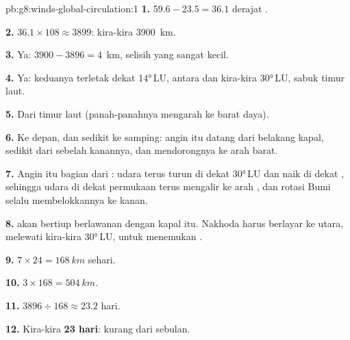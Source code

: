 \begin{solution}{pb:g8:winds-global-circulation:1}
\textbf{1.} $59.6 - 23.5 = 36.1$ derajat .

\textbf{2.} $36.1 \times 108 \approx 3899$: kira-kira \qty{3900}{km}.

\textbf{3.} Ya: $3900 - 3896 = 4$~km, selisih yang sangat kecil.

\textbf{4.} Ya: keduanya terletak dekat \ang{14}\,LU, antara 
dan kira-kira \ang{30}\,LU, sabuk  timur laut.

\textbf{5.} Dari timur laut (panah-panahnya mengarah ke barat daya).

\textbf{6.} Ke depan, dan sedikit ke samping: angin itu datang dari
belakang kapal, sedikit dari sebelah kanannya, dan mendorongnya ke arah
barat.

\textbf{7.} Angin itu bagian dari : udara terus turun di
dekat \ang{30}\,LU dan naik di dekat , sehingga udara di dekat
permukaan terus mengalir ke arah , dan rotasi Bumi selalu
membelokkannya ke kanan.

\textbf{8.}  akan bertiup berlawanan dengan kapal itu. Nakhoda
harus berlayar ke utara, melewati kira-kira \ang{30}\,LU, untuk menemukan
.

\textbf{9.} $7 \times 24 = \qty{168}{km}$ sehari.

\textbf{10.} $3 \times 168 = \qty{504}{km}$.

\textbf{11.} $3896 \div 168 \approx 23.2$ hari.

\textbf{12.} Kira-kira \textbf{23 hari}: kurang dari sebulan.
\end{solution}
